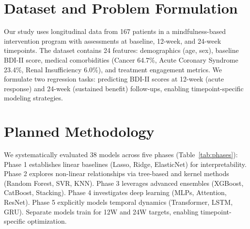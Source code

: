 \documentclass[conference]{IEEEtran}
\begin{document}
\section{Dataset and Problem Formulation}

Our study uses longitudinal data from 167 patients in a mindfulness-based intervention program with assessments at baseline, 12-week, and 24-week timepoints. The dataset contains 24 features: demographics (age, sex), baseline BDI-II score, medical comorbidities (Cancer 64.7\%, Acute Coronary Syndrome 23.4\%, Renal Insufficiency 6.0\%), and treatment engagement metrics. We formulate two regression tasks: predicting BDI-II scores at 12-week (acute response) and 24-week (sustained benefit) follow-ups, enabling timepoint-specific modeling strategies.

\section{Planned Methodology}

We systematically evaluated 38 models across five phases (Table~\ref{tab:phases}): Phase 1 establishes linear baselines (Lasso, Ridge, ElasticNet) for interpretability. Phase 2 explores non-linear relationships via tree-based and kernel methods (Random Forest, SVR, KNN). Phase 3 leverages advanced ensembles (XGBoost, CatBoost, Stacking). Phase 4 investigates deep learning (MLPs, Attention, ResNet). Phase 5 explicitly models temporal dynamics (Transformer, LSTM, GRU). Separate models train for 12W and 24W targets, enabling timepoint-specific optimization.

\begin{table}[h]
\centering
\caption{Multi-Phase Modeling Framework}
\label{tab:phases}
\end{table}
\end{document}
